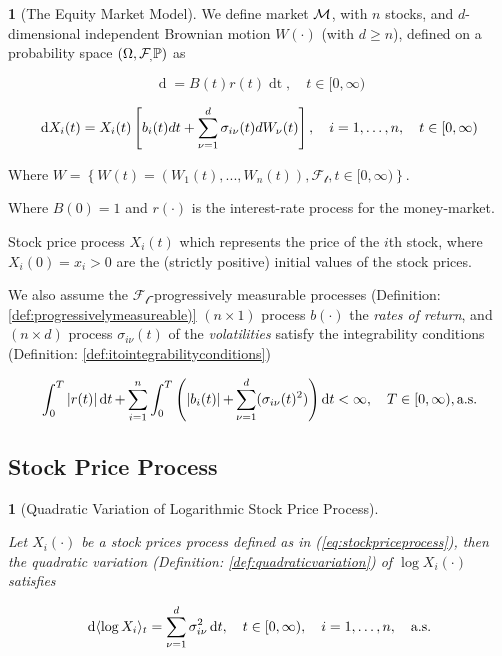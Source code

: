 \documentclass[british]{amsart}
\numberwithin{equation}{section}
\numberwithin{figure}{section}
\theoremstyle{plain}
\theoremstyle{definition}
\newtheorem{defn}[thm]{\protect\definitionname}
\theoremstyle{plain}
\theoremstyle{plain}
\theoremstyle{plain}
\newtheorem{prop}[thm]{\protect\propositionname}
\theoremstyle{remark}
\theoremstyle{plain}
\providecommand{\definitionname}{Definition}
\providecommand{\propositionname}{Proposition}
\renewcommand{\d}[1]{\mathop{\mathrm{d}{#1}}}
\newcommand{\ranget}{t\in[0,\infty)}
\newcommand{\filtration}[1]{\mathcal{F_{#1}}}
\newcommand{\almostsurely}{\text{a.s.}}
\begin{document}
\begin{defn} [The Equity Market Model]
	\label{def:marketmodel}
 	\cite{fernholz2009} 
	We define market $\mathcal{M}$, with $n$ stocks, and $d$-dimensional independent Brownian 
	motion $W(\cdot)$ (with $d \ge n$), defined on a probability space 
	$\probabilityspace$ as

	\begin{equation*}
		\label{eq:equitymarketmodelriskfree}
		\d{B(t)} = B(t)r(t)\d{t},
		\quad \ranget
	\end{equation*}

	\begin{equation}
		\label{eq:stockpriceprocess}
		\d{X_{i}(t)} = X_{i}(t) 
				\left[
					b_{i}(t)dt + 
					\sum_{\nu=1}^{d} \sigma_{i\nu}(t) dW_{\nu}(t)
				\right],
				\quad \rangei,
				\quad \ranget
	\end{equation}

	Where $W = \left\{ W(t)=(W_{1}(t),...,W_{n}(t)),\filtration{t},\ranget 
\right\}$.

	Where $B(0)=1$ and $r(\cdot)$ is the interest-rate process for the money-market.

	Stock price process $X_{i}(t)$ which represents the price of the $i$th stock, where $X_{i}(0) = x_{i} > 0$ are the (strictly positive) initial values of the stock prices.

	We also assume the $\filtration{t}$-progressively measurable processes (Definition: 
	\ref{def:progressivelymeasureable)} $(n \times 1)$ process $b(\cdot)$ the 
	\textit{rates of return}, and $(n \times d)$ process $\sigma_{i\nu}(t)$ of the 
	\textit{volatilities} satisfy the integrability conditions (Definition: 
	\ref{def:itointegrabilityconditions})

	\begin{equation*}
		\int_{0}^{T} 
		\abs{r(t)} 
		\d{t} +
		\sum_{i=1}^{n} \int_{0}^{T} 
			\left( 
					\abs{b_{i}(t)} +
					\sum_{\nu=1}^{d} ( \sigma_{i\nu}(t)^2  ) 
					\right) \d{t} < \infty,
		\quad
		T \in [0, \infty),
		\almostsurely
	\end{equation*}

\end{defn}

\subsection{Stock Price Process}

\begin{prop} [Quadratic Variation of Logarithmic Stock Price Process]
	\label{prop:crossvarlogX}

	Let $X_{i}(\cdot)$ be a stock prices process defined as in (\ref{eq:stockpriceprocess}), 
	then the quadratic variation (Definition: \ref{def:quadraticvariation}) of
	$\log{X_{i}(\cdot)}$ satisfies

	\begin{equation}
		\d{\langle \log{X_{i}} \rangle_{t}} = \sum_{\nu=1}^{d} \sigma_{i\nu}^2\d{t},
		\quad \ranget,
		\quad \rangei,
		\quad \almostsurely
	\end{equation}

\end{prop}
\end{document}
